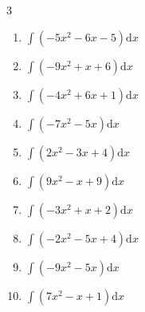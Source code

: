 \begin{multicols}{3}
\begin{enumerate}

\columnbreak %

  \item $\displaystyle \int \left( -5x^{2}-6x-5 \right) \mathrm{d}x$


  \item $\displaystyle \int \left( -9x^{2}+x+6 \right) \mathrm{d}x$


  \item $\displaystyle \int \left( -4x^{2}+6x+1 \right) \mathrm{d}x$


  \item $\displaystyle \int \left( -7x^{2}-5x \right) \mathrm{d}x$


  \item $\displaystyle \int \left( 2x^{2}-3x+4 \right) \mathrm{d}x$


  \item $\displaystyle \int \left( 9x^{2}-x+9 \right) \mathrm{d}x$


  \item $\displaystyle \int \left( -3x^{2}+x+2 \right) \mathrm{d}x$


  \item $\displaystyle \int \left( -2x^{2}-5x+4 \right) \mathrm{d}x$


  \item $\displaystyle \int \left( -9x^{2}-5x \right) \mathrm{d}x$


  \item $\displaystyle \int \left( 7x^{2}-x+1 \right) \mathrm{d}x$


\end{enumerate}
\end{multicols}
